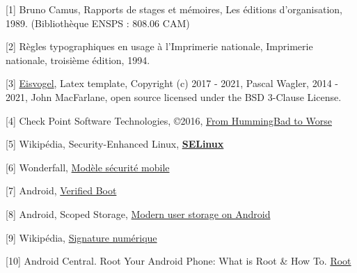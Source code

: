 \documentclass[
  french,
  paper=a4,
  ,captions=tableheading
]{scrartcl}
\begin{document}
{[}1{]} Bruno Camus, Rapports de stages et mémoires, Les éditions
d'organisation, 1989. (Bibliothèque ENSPS : 808.06 CAM)

{[}2{]} Règles typographiques en usage à l'Imprimerie nationale,
Imprimerie nationale, troisième édition, 1994.

{[}3{]}
\href{https://github.com/Wandmalfarbe/pandoc-latex-template}{Eisvogel},
Latex template, Copyright (c) 2017 - 2021, Pascal Wagler, 2014 - 2021,
John MacFarlane, open source licensed under the BSD 3-Clause License.

{[}4{]} Check Point Software Technologies, ©2016,
\href{https://blog.checkpoint.com/wp-content/uploads/2016/07/HummingBad-Research-report_FINAL-62916.pdf}{From
HummingBad to Worse}

{[}5{]} Wikipédia, Security-Enhanced Linux,
\href{https://fr.wikipedia.org/wiki/SELinux}{\textbf{SELinux}}

{[}6{]} Wonderfall,
\href{https://wonderfall.space/modele-securite-mobile/}{Modèle sécurité
mobile}

{[}7{]} Android,
\href{https://source.android.com/security/verifiedboot}{Verified Boot}

{[}8{]} Android, Scoped Storage,
\href{https://medium.com/androiddevelopers/modern-user-storage-on-android-e9469e8624f9}{Modern
user storage on Android}

{[}9{]} Wikipédia,
\href{https://fr.wikipedia.org/wiki/Signature_numérique}{Signature
numérique}

{[}10{]} Android Central. Root Your Android Phone: What is Root \& How
To. \href{https://www.androidcentral.com/root}{Root}
\end{document}
